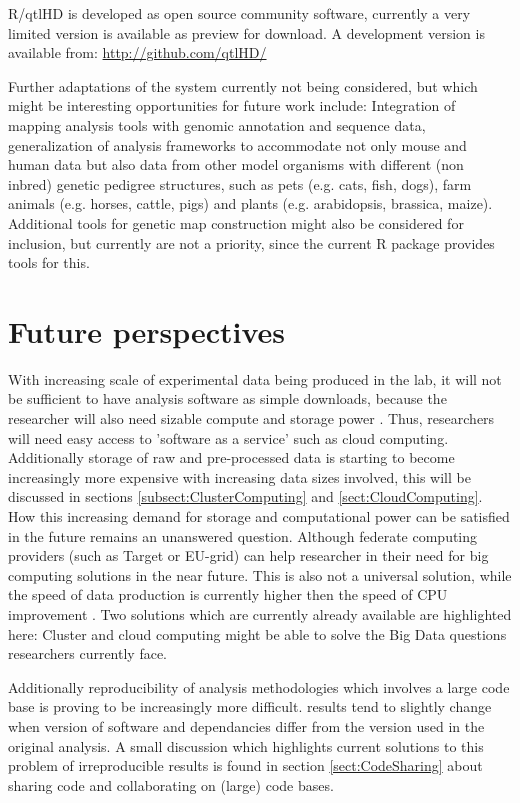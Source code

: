 R/qtlHD is developed as open source community software, currently a very limited version 
is available as preview for download. A development version is available from: 
\url{http://github.com/qtlHD/}

Further adaptations of the system currently not being considered, but which might be interesting opportunities for 
future work include: Integration of mapping analysis tools with genomic annotation and sequence data, generalization 
of analysis frameworks to accommodate not only mouse and human data but also data from other model organisms with 
different (non inbred) genetic pedigree structures, such as pets (e.g. cats, fish, dogs), farm animals (e.g. horses, 
cattle, pigs) and plants (e.g. arabidopsis, brassica, maize). Additional tools for genetic map construction might 
also be considered for inclusion, but currently are not a priority, since the current R package provides tools for 
this.

\section{Future perspectives}
\label{sect:Future}
With increasing scale of experimental data being produced in the lab, it will not be 
sufficient to have analysis software as simple downloads, because the researcher will 
also need sizable compute and storage power \cite{Schadt:2010}. Thus, researchers will 
need easy access to 'software as a service' such as cloud computing. Additionally storage 
of raw and pre-processed data is starting to become increasingly more expensive with 
increasing data sizes involved, this will be discussed in sections \ref{subsect:ClusterComputing} 
and \ref{sect:CloudComputing}. 
How this increasing demand for storage and computational power can be satisfied in the future remains 
an unanswered question. Although federate computing providers (such as Target or EU-grid) can help 
researcher in their need for big computing solutions in the near future. This is also not a 
universal solution, while the speed of data production is currently higher then the speed of 
CPU improvement \cite{Moore:1998, Editorial:2009, Shah:2013}. Two solutions which are 
currently already available are highlighted here: Cluster and cloud computing might be able to 
solve the Big Data questions researchers currently face.

Additionally reproducibility of analysis methodologies which involves a large code base is proving 
to be increasingly more difficult. results tend to slightly change when version of software and 
dependancies differ from the version used in the original analysis. A small discussion which highlights 
current solutions to this problem of irreproducible results is found in section \ref{sect:CodeSharing} 
about sharing code and collaborating on (large) code bases.

